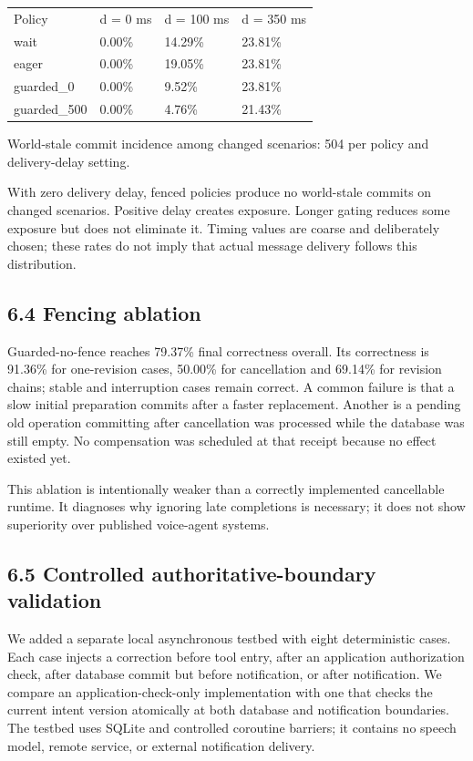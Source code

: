 \documentclass[10pt]{article}
\begin{document}
{\scriptsize
\begin{tabularx}{\textwidth}{XXXX}
\hline
Policy & d = 0 ms & d = 100 ms & d = 350 ms \\
wait & 0.00\% & 14.29\% & 23.81\% \\
eager & 0.00\% & 19.05\% & 23.81\% \\
guarded\_0 & 0.00\% & 9.52\% & 23.81\% \\
guarded\_500 & 0.00\% & 4.76\% & 21.43\% \\
\hline
\end{tabularx}
}


World-stale commit incidence among changed scenarios: 504 per policy and delivery-delay setting.


With zero delivery delay, fenced policies produce no world-stale commits on changed scenarios. Positive delay creates exposure. Longer gating reduces some exposure but does not eliminate it. Timing values are coarse and deliberately chosen; these rates do not imply that actual message delivery follows this distribution.


\subsection*{6.4 Fencing ablation}

Guarded-no-fence reaches 79.37\% final correctness overall. Its correctness is 91.36\% for one-revision cases, 50.00\% for cancellation and 69.14\% for revision chains; stable and interruption cases remain correct. A common failure is that a slow initial preparation commits after a faster replacement. Another is a pending old operation committing after cancellation was processed while the database was still empty. No compensation was scheduled at that receipt because no effect existed yet.


This ablation is intentionally weaker than a correctly implemented cancellable runtime. It diagnoses why ignoring late completions is necessary; it does not show superiority over published voice-agent systems.


\subsection*{6.5 Controlled authoritative-boundary validation}

We added a separate local asynchronous testbed with eight deterministic cases. Each case injects a correction before tool entry, after an application authorization check, after database commit but before notification, or after notification. We compare an application-check-only implementation with one that checks the current intent version atomically at both database and notification boundaries. The testbed uses SQLite and controlled coroutine barriers; it contains no speech model, remote service, or external notification delivery.
\end{document}
